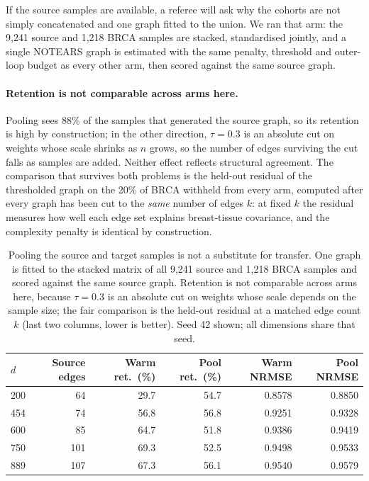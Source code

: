 \documentclass[11pt]{article}
\begin{document}
If the source samples are available, a referee will ask why the cohorts are not simply
concatenated and one graph fitted to the union. We ran that arm: the 9{,}241 source and
1{,}218 BRCA samples are stacked, standardised jointly, and a single NOTEARS graph is
estimated with the same penalty, threshold and outer-loop budget as every other arm, then
scored against the same source graph.

\paragraph{Retention is not comparable across arms here.} Pooling sees 88\% of the samples
that generated the source graph, so its retention is high by construction; in the other
direction, $\tau=0.3$ is an absolute cut on weights whose scale shrinks as $n$ grows, so the
number of edges surviving the cut falls as samples are added. Neither effect reflects
structural agreement. The comparison that survives both problems is the held-out residual of
the thresholded graph on the 20\% of BRCA withheld from every arm, computed after every graph
has been cut to the \emph{same} number of edges $k$: at fixed $k$ the residual measures how
well each edge set explains breast-tissue covariance, and the complexity penalty is identical
by construction.

\setcounter{table}{8}
\begin{table}[h]
\caption{Pooling the source and target samples is not a substitute for transfer. One graph is fitted to the stacked matrix of all 9{,}241 source and 1{,}218 BRCA samples and scored against the same source graph. Retention is not comparable across arms here, because $\tau=0.3$ is an absolute cut on weights whose scale depends on the sample size; the fair comparison is the held-out residual at a matched edge count $k$ (last two columns, lower is better). Seed 42 shown; all dimensions share that seed.}
\begin{tabular}{@{}lrrrrr@{}}
\toprule
$d$ & Source edges & Warm ret.\ (\%) & Pool ret.\ (\%) & Warm NRMSE & Pool NRMSE\\
\midrule
200 & 64 & 29.7 & 54.7 & 0.8578 & 0.8850\\
454 & 74 & 56.8 & 56.8 & 0.9251 & 0.9328\\
600 & 85 & 64.7 & 51.8 & 0.9386 & 0.9419\\
750 & 101 & 69.3 & 52.5 & 0.9498 & 0.9533\\
889 & 107 & 67.3 & 56.1 & 0.9540 & 0.9579\\
\bottomrule
\end{tabular}
\label{tab:S9}
\end{table}
\end{document}
